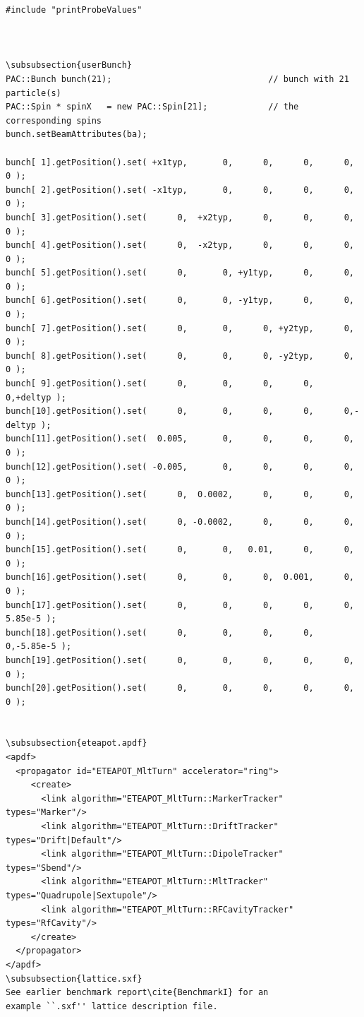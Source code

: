 \documentclass[]{article}
\begin{document}
\begin{verbatim}
#include "printProbeValues"



\subsubsection{userBunch}
PAC::Bunch bunch(21);                               // bunch with 21 particle(s)
PAC::Spin * spinX   = new PAC::Spin[21];            // the corresponding spins
bunch.setBeamAttributes(ba);

bunch[ 1].getPosition().set( +x1typ,       0,      0,      0,      0,      0 );
bunch[ 2].getPosition().set( -x1typ,       0,      0,      0,      0,      0 );
bunch[ 3].getPosition().set(      0,  +x2typ,      0,      0,      0,      0 );
bunch[ 4].getPosition().set(      0,  -x2typ,      0,      0,      0,      0 );
bunch[ 5].getPosition().set(      0,       0, +y1typ,      0,      0,      0 );
bunch[ 6].getPosition().set(      0,       0, -y1typ,      0,      0,      0 );
bunch[ 7].getPosition().set(      0,       0,      0, +y2typ,      0,      0 );
bunch[ 8].getPosition().set(      0,       0,      0, -y2typ,      0,      0 );
bunch[ 9].getPosition().set(      0,       0,      0,      0,      0,+deltyp );
bunch[10].getPosition().set(      0,       0,      0,      0,      0,-deltyp );
bunch[11].getPosition().set(  0.005,       0,      0,	   0,      0,      0 );
bunch[12].getPosition().set( -0.005,       0,      0,	   0,      0,      0 );
bunch[13].getPosition().set(	  0,  0.0002,      0,	   0,      0,      0 );
bunch[14].getPosition().set(      0, -0.0002,      0,      0,      0,      0 );
bunch[15].getPosition().set(  	  0,	   0,   0.01,      0,      0,      0 );
bunch[16].getPosition().set(  	  0,	   0,	   0,  0.001,      0,      0 );
bunch[17].getPosition().set(  	  0,	   0,      0,      0,      0, 5.85e-5 );
bunch[18].getPosition().set(  	  0,       0,      0,      0,      0,-5.85e-5 );
bunch[19].getPosition().set(  	  0,       0,      0,      0,      0,      0 );
bunch[20].getPosition().set(  	  0,       0,      0,      0,      0,      0 );


\subsubsection{eteapot.apdf}
<apdf>
  <propagator id="ETEAPOT_MltTurn" accelerator="ring">
     <create>
       <link algorithm="ETEAPOT_MltTurn::MarkerTracker" types="Marker"/>
       <link algorithm="ETEAPOT_MltTurn::DriftTracker" types="Drift|Default"/>
       <link algorithm="ETEAPOT_MltTurn::DipoleTracker" types="Sbend"/>
       <link algorithm="ETEAPOT_MltTurn::MltTracker" types="Quadrupole|Sextupole"/>
       <link algorithm="ETEAPOT_MltTurn::RFCavityTracker" types="RfCavity"/>
     </create>
  </propagator>
</apdf>
\subsubsection{lattice.sxf}
See earlier benchmark report\cite{BenchmarkI} for an
example ``.sxf'' lattice description file.
\end{verbatim}
\end{document}
